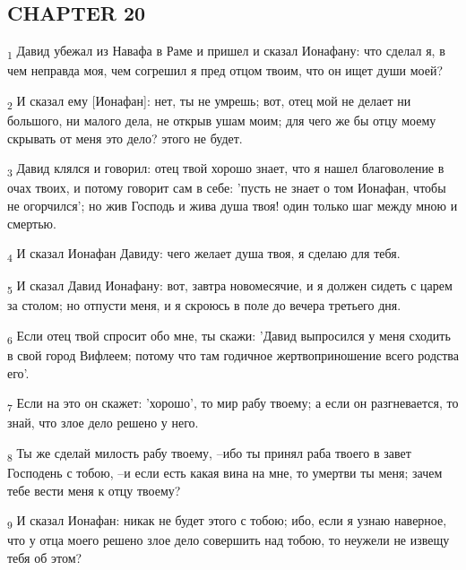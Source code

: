\subsection{CHAPTER 20}
\begin{tcolorbox}
\textsubscript{1} Давид убежал из Навафа в Раме и пришел и сказал Ионафану: что сделал я, в чем неправда моя, чем согрешил я пред отцом твоим, что он ищет души моей?
\end{tcolorbox}
\begin{tcolorbox}
\textsubscript{2} И сказал ему [Ионафан]: нет, ты не умрешь; вот, отец мой не делает ни большого, ни малого дела, не открыв ушам моим; для чего же бы отцу моему скрывать от меня это дело? этого не будет.
\end{tcolorbox}
\begin{tcolorbox}
\textsubscript{3} Давид клялся и говорил: отец твой хорошо знает, что я нашел благоволение в очах твоих, и потому говорит сам в себе: 'пусть не знает о том Ионафан, чтобы не огорчился'; но жив Господь и жива душа твоя! один только шаг между мною и смертью.
\end{tcolorbox}
\begin{tcolorbox}
\textsubscript{4} И сказал Ионафан Давиду: чего желает душа твоя, я сделаю для тебя.
\end{tcolorbox}
\begin{tcolorbox}
\textsubscript{5} И сказал Давид Ионафану: вот, завтра новомесячие, и я должен сидеть с царем за столом; но отпусти меня, и я скроюсь в поле до вечера третьего дня.
\end{tcolorbox}
\begin{tcolorbox}
\textsubscript{6} Если отец твой спросит обо мне, ты скажи: 'Давид выпросился у меня сходить в свой город Вифлеем; потому что там годичное жертвоприношение всего родства его'.
\end{tcolorbox}
\begin{tcolorbox}
\textsubscript{7} Если на это он скажет: 'хорошо', то мир рабу твоему; а если он разгневается, то знай, что злое дело решено у него.
\end{tcolorbox}
\begin{tcolorbox}
\textsubscript{8} Ты же сделай милость рабу твоему, --ибо ты принял раба твоего в завет Господень с тобою, --и если есть какая вина на мне, то умертви ты меня; зачем тебе вести меня к отцу твоему?
\end{tcolorbox}
\begin{tcolorbox}
\textsubscript{9} И сказал Ионафан: никак не будет этого с тобою; ибо, если я узнаю наверное, что у отца моего решено злое дело совершить над тобою, то неужели не извещу тебя об этом?
\end{tcolorbox}
